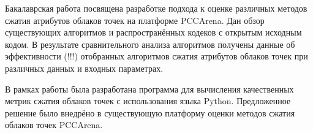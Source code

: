 Бакалаврская работа посвящена разработке подхода к оценке различных методов
сжатия атрибутов облаков точек на платформе PCCArena. Дан обзор существующих
алгоритмов и распространённых кодеков с открытым исходным кодом. В результате
сравнительного анализа алгоритмов получены данные об эффективности (!!!)
отобранных алгоритмов сжатия атрибутов облаков точек при различных данных и
входных параметрах.

В рамках работы была разработана программа для вычисления качественных метрик
сжатия облаков точек с использования языка Python. Предложенное решение было
внедрёно в существующую платформу оценки методов сжатия облаков точек PCCArena.
